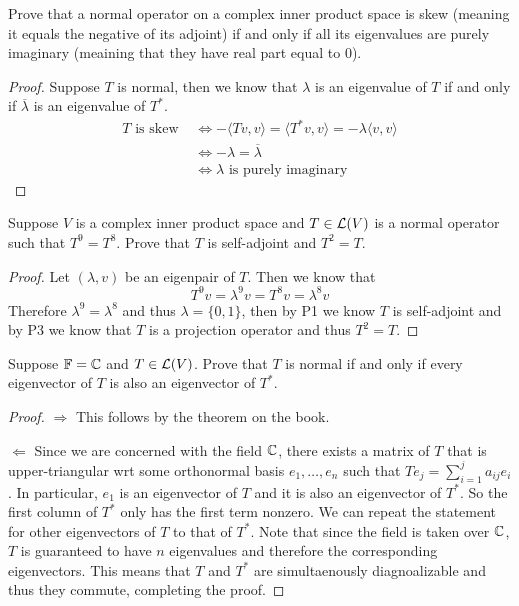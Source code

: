 \documentclass{extarticle}
\begin{document}
\begin{problem}{4}
    Prove that a normal operator on a complex inner product space is skew (meaning it equals the negative 
    of its adjoint) if and only if all its eigenvalues are purely imaginary (meaining that they have 
    real part equal to 0).
\end{problem}

\begin{proof}
Suppose \(T\) is normal, then we know that \(\lambda\) is an eigenvalue of \(T\) if and only if 
\(\overline{\lambda}\) is an eigenvalue of \(T^*\).  
\begin{align*}
    T \text{ is skew } 
    &\Longleftrightarrow -\langle Tv,v \rangle = \langle T^*v,v \rangle = - \lambda \langle v,v \rangle \\ 
    &\Longleftrightarrow -\lambda = \overline{\lambda} \\ 
    &\Longleftrightarrow \lambda \text{ is purely imaginary} 
\end{align*}
\end{proof}


\begin{problem}{6}
    Suppose \(V\) is a complex inner product space and \(T \in \mathcal{L}(V)\) is a normal operator such 
    that \(T^9 = T^8\). Prove that \(T\) is self-adjoint and \(T^2 = T\).
\end{problem}

\begin{proof}
Let \((\lambda, v)\) be an eigenpair of \(T\). Then we know that 
\[T^9v = \lambda^9 v = T^8v = \lambda^8 v\]
Therefore \(\lambda^9 = \lambda^8\) and thus \(\lambda = \{0, 1\}\), then by P1 we know \(T\) 
is self-adjoint and by P3 we know that \(T\) is a projection operator and thus \(T^2 = T\).
\end{proof}


\begin{problem}{8}
    Suppose \(\mathbb{F} = \mathbb{C}\) and \(T \in \mathcal{L}(V)\). Prove that \(T\) is normal if and only if 
    every eigenvector of \(T\) is also an eigenvector of \(T^*\).
\end{problem}

\begin{proof}
\(\Rightarrow\) This follows by the theorem on the book. 

\(\Leftarrow\) Since we are concerned with the field \(\mathbb{C}\), there exists a matrix of \(T\) that 
is upper-triangular wrt some orthonormal basis \(e_1, \ldots, e_n\) such that 
\(T e_j = \sum_{i=1}^{j} a_{ij} e_i\). In particular, \(e_1\) is an eigenvector of \(T\) and it is 
also an eigenvector of \(T^*\). So the first column of \(T^*\) only has the first term nonzero. We can 
repeat the statement for other eigenvectors of \(T\) to that of \(T^*\). Note that since the field 
is taken over \(\mathbb{C}\), \(T\) is guaranteed to have \(n\) eigenvalues and therefore the corresponding 
eigenvectors. This means that \(T\) and \(T^*\) are simultaenously diagnoalizable and thus they 
commute, completing the proof.  
\end{proof}
\end{document}
